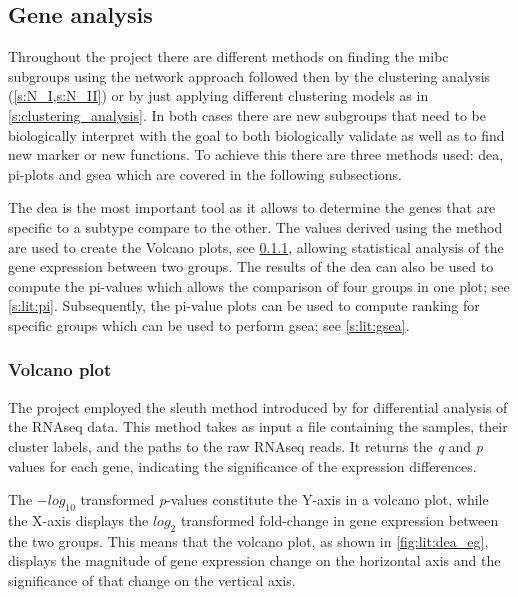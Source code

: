 \subsection{Gene analysis} \label{s:lit:gene_analysis}


Throughout the project there are different methods on finding the \acrfull{mibc} subgroups using the network approach followed then by the clustering analysis (\cref{s:N_I,s:N_II}) or by just applying different clustering models as in \cref{s:clustering_analysis}. In both cases there are new subgroups that need to be biologically interpret with the goal to both biologically validate as well as to find new marker or new functions. To achieve this there are three methods used: \acrfull{dea}, pi-plots and \acrfull{gsea} which are covered in the following subsections. 

The \acrshort{dea} is the most important tool as it allows to determine the genes that are specific to a subtype compare to the other. The values derived using the method are used to create the Volcano plots, see \cref{s:lit:dea}, allowing statistical analysis of the gene expression between two groups. The results of the \acrshort{dea} can also be used to compute the pi-values \citet{Xiao2014-zn} which allows the comparison of four groups in one plot; see \cref{s:lit:pi}. Subsequently, the pi-value plots can be used to compute ranking for specific groups which can be used to perform \acrlong{gsea}; see \cref{s:lit:gsea}.


\subsubsection{Volcano plot} \label{s:lit:dea}


The project employed the sleuth method introduced by \citet{Pimentel2017-xp} for differential analysis of the RNAseq data. This method takes as input a file containing the samples, their cluster labels, and the paths to the raw RNAseq reads. It returns the \textit{q} and \textit{p} values for each gene, indicating the significance of the expression differences.

The $-log_{10}$ transformed \textit{p}-values constitute the Y-axis in a volcano plot, while the X-axis displays the $log_{2}$ transformed fold-change in gene expression between the two groups. This means that the volcano plot, as shown in \cref{fig:lit:dea_eg}, displays the magnitude of gene expression change on the horizontal axis and the significance of that change on the vertical axis.

